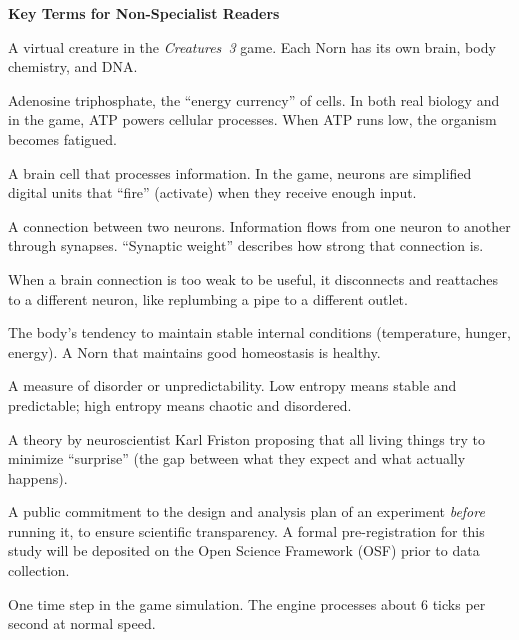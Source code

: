 \documentclass[12pt, a4paper]{article}
\begin{document}
\begin{glossarybox}
\textbf{Key Terms for Non-Specialist Readers}

\smallskip
\begin{description}[style=nextline, font=\small\bfseries, leftmargin=1.2cm, nosep, itemsep=3pt]
  \item[Norn] A virtual creature in the \textit{Creatures~3} game. Each Norn has its own brain, body chemistry, and DNA.
  \item[ATP] Adenosine triphosphate, the ``energy currency'' of cells. In both real biology and in the game, ATP powers cellular processes. When ATP runs low, the organism becomes fatigued.
  \item[Neuron] A brain cell that processes information. In the game, neurons are simplified digital units that ``fire'' (activate) when they receive enough input.
  \item[Synapse] A connection between two neurons. Information flows from one neuron to another through synapses. ``Synaptic weight'' describes how strong that connection is.
  \item[Synaptic Migration] When a brain connection is too weak to be useful, it disconnects and reattaches to a different neuron, like replumbing a pipe to a different outlet.
  \item[Homeostasis] The body's tendency to maintain stable internal conditions (temperature, hunger, energy). A Norn that maintains good homeostasis is healthy.
  \item[Entropy] A measure of disorder or unpredictability. Low entropy means stable and predictable; high entropy means chaotic and disordered.
  \item[Free Energy Principle (FEP)] A theory by neuroscientist Karl Friston proposing that all living things try to minimize ``surprise'' (the gap between what they expect and what actually happens).
  \item[Pre-Registration] A public commitment to the design and analysis plan of an experiment \emph{before} running it, to ensure scientific transparency. A formal pre-registration for this study will be deposited on the Open Science Framework (OSF) prior to data collection.
  \item[Tick] One time step in the game simulation. The engine processes about 6 ticks per second at normal speed.
\end{description}
\end{glossarybox}
\end{document}
